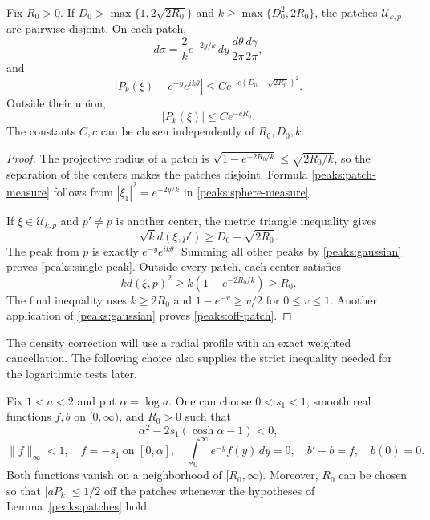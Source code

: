 \begin{lemma}\label{peaks:patches}
Fix $R_0>0$.  If $D_0>\max\{1,2\sqrt{2R_0}\}$ and
$k\ge\max\{D_0^2,2R_0\}$, the patches $\mathcal U_{k,p}$
are pairwise disjoint.  On each patch,
\begin{equation}\label{peaks:patch-measure}
 d\sigma=\frac2k e^{-2y/k}\,dy\,
             \frac{d\theta}{2\pi}\frac{d\gamma}{2\pi},
\end{equation}
and
\begin{equation}\label{peaks:single-peak}
 |P_k(\xi)-e^{-y}e^{ik\theta}|
 \le C e^{-c(D_0-\sqrt{2R_0})^2}.
\end{equation}
Outside their union,
\begin{equation}\label{peaks:off-patch}
 |P_k(\xi)|\le Ce^{-cR_0}.
\end{equation}
The constants $C,c$ can be chosen independently of $R_0,D_0,k$.
\end{lemma}

\begin{proof}
The projective radius of a patch is
$\sqrt{1-e^{-2R_0/k}}\le\sqrt{2R_0/k}$, so the separation of
the centers makes the patches disjoint.  Formula
\eqref{peaks:patch-measure} follows from
$|\xi_1|^2=e^{-2y/k}$ in \eqref{peaks:sphere-measure}.

If $\xi\in\mathcal U_{k,p}$ and $p'\ne p$ is another center,
the metric triangle inequality gives
\[
 \sqrt{k}d(\xi,p')\ge D_0-\sqrt{2R_0}.
\]
The peak from $p$ is exactly $e^{-y}e^{ik\theta}$.
Summing all other peaks by \eqref{peaks:gaussian} proves
\eqref{peaks:single-peak}.
Outside every patch, each center satisfies
\[
 kd(\xi,p)^2\ge k(1-e^{-2R_0/k})\ge R_0.
\]
The final inequality uses $k\ge2R_0$ and
$1-e^{-v}\ge v/2$ for $0\le v\le1$.  Another application of
\eqref{peaks:gaussian} proves \eqref{peaks:off-patch}.
\end{proof}

The density correction will use a radial profile with an exact
weighted cancellation.  The following choice also supplies the
strict inequality needed for the logarithmic tests later.

\begin{lemma}\label{peaks:profiles}
Fix $1<a<2$ and put $\alpha=\log a$.  One can choose $0<s_1<1$,
smooth real functions $f,b$ on $[0,\infty)$, and $R_0>0$ such that
\begin{equation}\label{peaks:profile-negativity}
 \alpha^2-2s_1(\cosh\alpha-1)<0,
\end{equation}
\begin{equation}\label{peaks:profile-identities}
 \|f\|_\infty<1,\quad f=-s_1\ \text{on }[0,\alpha],\quad
 \int_0^\infty e^{-y}f(y)\,dy=0,\quad
 b'-b=f,\quad b(0)=0.
\end{equation}
Both functions vanish on a neighborhood of $[R_0,\infty)$.
Moreover, $R_0$ can be chosen so that $|aP_k|\le1/2$ off the
patches whenever the hypotheses of Lemma~\ref{peaks:patches} hold.
\end{lemma}

